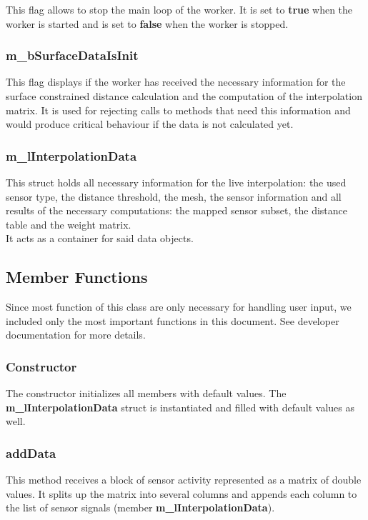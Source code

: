 This flag allows to stop the main loop of the worker. It is set to \textbf{true} when the worker is started and is set to \textbf{false} when the worker is stopped.

\subsubsection{m\_bSurfaceDataIsInit}

This flag displays if the worker has received the necessary information for the surface constrained distance calculation and the computation of the interpolation matrix. It is used for rejecting calls to methods that need this information and would produce critical behaviour if the data is not calculated yet.

\subsubsection{m\_lInterpolationData}

This struct holds all necessary information for the live interpolation: the used sensor type, the distance threshold, the mesh, the sensor information and all results of the necessary computations: the mapped sensor subset, the distance table and the weight matrix.\\
It acts as a container for said data objects.

\subsection{Member Functions}

Since most function of this class are only necessary for handling user input, we included only the most important functions in this document. See developer documentation for more details.

\subsubsection{Constructor}

The constructor initializes all members with default values. The \textbf{m\_lInterpolationData} struct is instantiated and filled with default values as well.

\subsubsection{addData}

This method receives a block of sensor activity represented as a matrix of double values. It splits up the matrix into several columns and appends each column to the list of sensor signals (member \textbf{m\_lInterpolationData}).

